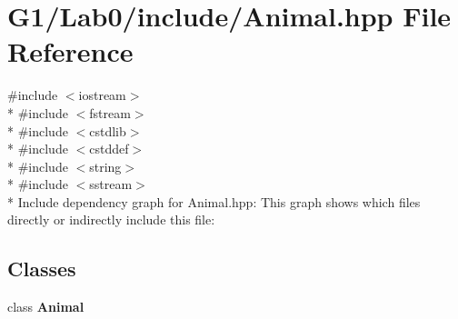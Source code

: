 \section{G1/\+Lab0/include/\+Animal.hpp File Reference}
\label{_animal_8hpp}
{\ttfamily \#include $<$iostream$>$}\\*
{\ttfamily \#include $<$fstream$>$}\\*
{\ttfamily \#include $<$cstdlib$>$}\\*
{\ttfamily \#include $<$cstddef$>$}\\*
{\ttfamily \#include $<$string$>$}\\*
{\ttfamily \#include $<$sstream$>$}\\*
Include dependency graph for Animal.\+hpp\+:
This graph shows which files directly or indirectly include this file\+:
\subsection*{Classes}
\begin{DoxyCompactItemize}
\item 
class {\bf Animal}
\end{DoxyCompactItemize}
